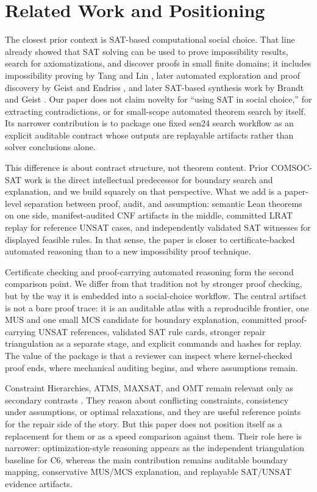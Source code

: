 \section{Related Work and Positioning}

The closest prior context is SAT-based computational social choice.
That line already showed that SAT solving can be used to prove impossibility results, search for axiomatizations, and discover proofs in small finite domains; it includes impossibility proving by Tang and Lin \citep{tanglin2009computer}, later automated exploration and proof discovery by Geist and Endriss \citep{geist2011automated}, and later SAT-based synthesis work by Brandt and Geist \citep{brandtgeist2016strategyproof}.
Our paper does not claim novelty for ``using SAT in social choice,'' for extracting contradictions, or for small-scope automated theorem search by itself.
Its narrower contribution is to package one fixed sen24 search workflow as an explicit auditable contract whose outputs are replayable artifacts rather than solver conclusions alone.

This difference is about contract structure, not theorem content.
Prior COMSOC-SAT work is the direct intellectual predecessor for boundary search and explanation, and we build squarely on that perspective.
What we add is a paper-level separation between proof, audit, and assumption: semantic Lean theorems on one side, manifest-audited CNF artifacts in the middle, committed LRAT replay for reference UNSAT cases, and independently validated SAT witnesses for displayed feasible rules.
In that sense, the paper is closer to certificate-backed automated reasoning than to a new impossibility proof technique.

Certificate checking and proof-carrying automated reasoning form the second comparison point.
We differ from that tradition not by stronger proof checking, but by the way it is embedded into a social-choice workflow.
The central artifact is not a bare proof trace: it is an auditable atlas with a reproducible frontier, one MUS and one small MCS candidate for boundary explanation, committed proof-carrying UNSAT references, validated SAT rule cards, stronger repair triangulation as a separate stage, and explicit commands and hashes for replay.
The value of the package is that a reviewer can inspect where kernel-checked proof ends, where mechanical auditing begins, and where assumptions remain.

Constraint Hierarchies, ATMS, MAXSAT, and OMT remain relevant only as secondary contrasts \citep{borning1992constraint,dekleer1986atms,bacchus2021maxsat,sebastiani2015omt}.
They reason about conflicting constraints, consistency under assumptions, or optimal relaxations, and they are useful reference points for the repair side of the story.
But this paper does not position itself as a replacement for them or as a speed comparison against them.
Their role here is narrower: optimization-style reasoning appears as the independent triangulation baseline for C6, whereas the main contribution remains auditable boundary mapping, conservative MUS/MCS explanation, and replayable SAT/UNSAT evidence artifacts.

